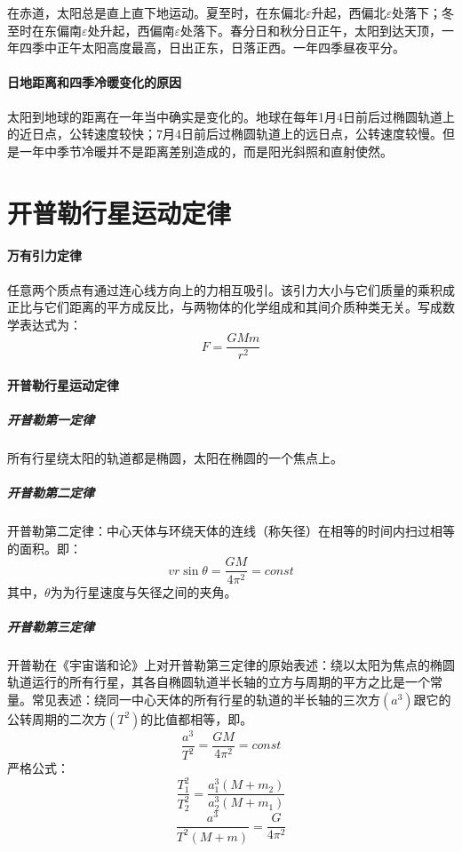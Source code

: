 在赤道，太阳总是直上直下地运动。夏至时，在东偏北$\varepsilon$升起，西偏北$\varepsilon$处落下；冬至时在东偏南$\varepsilon$处升起，西偏南$\varepsilon$处落下。春分日和秋分日正午，太阳到达天顶，一年四季中正午太阳高度最高，日出正东，日落正西。一年四季昼夜平分。

\paragraph{日地距离和四季冷暖变化的原因}太阳到地球的距离在一年当中确实是变化的。地球在每年1月4日前后过椭圆轨道上的近日点，公转速度较快；7月4日前后过椭圆轨道上的远日点，公转速度较慢。但是一年中季节冷暖并不是距离差别造成的，而是阳光斜照和直射使然。
\section{开普勒行星运动定律}
\paragraph{万有引力定律}
任意两个质点有通过连心线方向上的力相互吸引。该引力大小与它们质量的乘积成正比与它们距离的平方成反比，与两物体的化学组成和其间介质种类无关。写成数学表达式为：
\begin{equation}
	F=\frac{GMm}{r^2}
\end{equation}
\paragraph{开普勒行星运动定律}
\subparagraph{开普勒第一定律}所有行星绕太阳的轨道都是椭圆，太阳在椭圆的一个焦点上。
\subparagraph{开普勒第二定律}开普勒第二定律：中心天体与环绕天体的连线（称矢径）在相等的时间内扫过相等的面积。即：
\begin{equation}
	vr\sin \theta =\frac{GM}{4\pi ^2} = const
\end{equation}
其中，$\theta$为为行星速度与矢径之间的夹角。
\subparagraph{开普勒第三定律}开普勒在《宇宙谐和论》上对开普勒第三定律的原始表述：绕以太阳为焦点的椭圆轨道运行的所有行星，其各自椭圆轨道半长轴的立方与周期的平方之比是一个常量。常见表述：绕同一中心天体的所有行星的轨道的半长轴的三次方$(a^3)$跟它的公转周期的二次方$(T^2)$的比值都相等，即。
\begin{equation}
	\frac{a^3}{T^2}=\frac{GM}{4 \pi ^2}=const
\end{equation}
严格公式：
\begin{equation}
	\frac{T_{1}^2}{T_{2}^2}=\frac{a_{1}^3(M+m_{2})}{a_{2}^3(M+m_{1})}
\end{equation}
\begin{equation}
	\frac{a^3}{T^2(M+m)}=\frac{G}{4 \pi ^2}
\end{equation}
